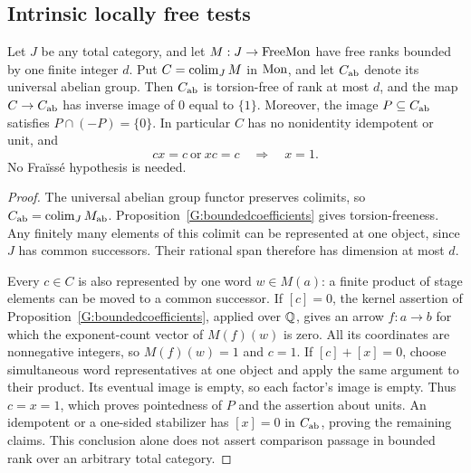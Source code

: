 \subsection{Intrinsic locally free tests}

\begin{proposition}
\label{G:boundedtarget}
Let $J$ be any total category, and let $M:J\to\mathrm{FreeMon}$ have
free ranks bounded by one finite integer $d$. Put $C=\operatorname*{colim}_JM$
in $\mathrm{Mon}$, and let $C_{\mathrm{ab}}$ denote its universal abelian group.
Then $C_{\mathrm{ab}}$ is torsion-free of rank at most $d$, and the map
$C\to C_{\mathrm{ab}}$ has inverse image of $0$ equal to $\{1\}$.
Moreover, the image $P\subseteq C_{\mathrm{ab}}$ satisfies
$P\cap(-P)=\{0\}$. In particular $C$ has no nonidentity
idempotent or unit, and
\[
 cx=c\ \text{or}\ xc=c\quad\Longrightarrow\quad x=1.
\]
No Fra\"iss\'e hypothesis is needed.
\end{proposition}
\begin{proof}
The universal abelian group functor preserves colimits, so
$C_{\mathrm{ab}}=\operatorname*{colim}_JM_{\mathrm{ab}}$. Proposition~\ref{G:boundedcoefficients}
gives torsion-freeness. Any finitely many elements of this colimit
can be represented at one object, since $J$ has common successors.
Their rational span therefore has dimension at most $d$.

Every $c\in C$ is also represented by one word $w\in M(a)$:
a finite product of stage elements can be moved to a common
successor. If $[c]=0$, the kernel assertion of
Proposition~\ref{G:boundedcoefficients}, applied over $\mathbb Q$, gives
an arrow $f:a\to b$ for which the exponent-count vector of
$M(f)(w)$ is zero. All its coordinates are nonnegative integers,
so $M(f)(w)=1$ and $c=1$. If $[c]+[x]=0$, choose simultaneous
word representatives at one object and apply the same argument
to their product. Its eventual image is empty, so each factor's
image is empty. Thus $c=x=1$, which proves pointedness of $P$
and the assertion about units. An idempotent or a one-sided
stabilizer has $[x]=0$ in $C_{\mathrm{ab}}$, proving the remaining claims.
This conclusion alone does not assert comparison passage in
bounded rank over an arbitrary total category.
\end{proof}

